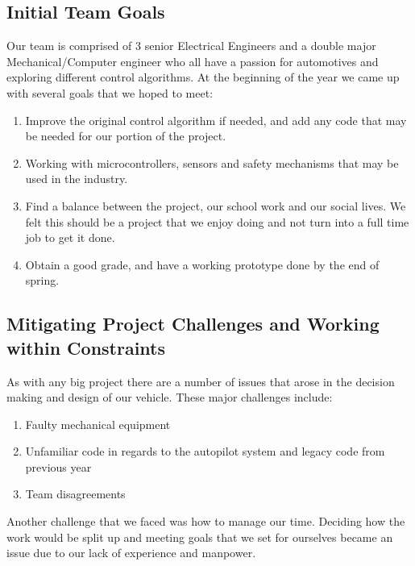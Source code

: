 		\subsection{Initial Team Goals}
			Our team is comprised of 3 senior Electrical Engineers and a double major Mechanical/Computer engineer who all have a passion for automotives and exploring different control algorithms.  At the beginning of the year we came up with several goals that we hoped to meet:
			\begin{enumerate}
				\item Improve the original control algorithm if needed, and add any code that may be needed for our portion of the project.
				\item Working with microcontrollers, sensors and safety mechanisms that may be used in the industry.
				\item Find a balance between the project, our school work and our social lives.  We felt this should be a project that we enjoy doing and not turn into a full time job to get it done. 
				\item Obtain a good grade, and have a working prototype done by the end of spring.
			\end{enumerate}
		
		
\subsection{Mitigating Project Challenges and Working within Constraints}

As with any big project there are a number of issues that arose in the decision making and design of our vehicle.  These major challenges include:

\begin{enumerate}
\item Faulty mechanical equipment
\item Unfamiliar code in regards to the autopilot system and legacy code from previous year
\item Team disagreements
\end{enumerate}

Another challenge that we faced was how to manage our time.  Deciding how the work would be split up and meeting goals that we set for ourselves became an issue due to our lack of experience and manpower.


